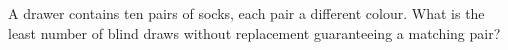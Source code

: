 A drawer contains ten pairs of socks, each pair a different colour. What is the least number of blind draws without replacement guaranteeing a matching pair?
